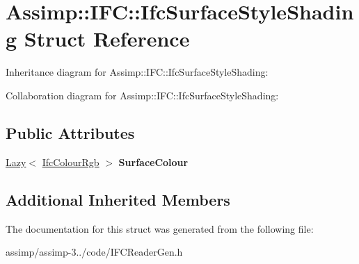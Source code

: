 \hypertarget{struct_assimp_1_1_i_f_c_1_1_ifc_surface_style_shading}{\section{Assimp\+:\+:I\+F\+C\+:\+:Ifc\+Surface\+Style\+Shading Struct Reference}
\label{struct_assimp_1_1_i_f_c_1_1_ifc_surface_style_shading}
}


Inheritance diagram for Assimp\+:\+:I\+F\+C\+:\+:Ifc\+Surface\+Style\+Shading\+:


Collaboration diagram for Assimp\+:\+:I\+F\+C\+:\+:Ifc\+Surface\+Style\+Shading\+:
\subsection*{Public Attributes}
\begin{DoxyCompactItemize}
\item 
\hypertarget{struct_assimp_1_1_i_f_c_1_1_ifc_surface_style_shading_ac8af1dc9d03beba92d7b45ffe92d6fc5}{\hyperlink{struct_assimp_1_1_s_t_e_p_1_1_lazy}{Lazy}$<$ \hyperlink{struct_assimp_1_1_i_f_c_1_1_ifc_colour_rgb}{Ifc\+Colour\+Rgb} $>$ {\bfseries Surface\+Colour}}\label{struct_assimp_1_1_i_f_c_1_1_ifc_surface_style_shading_ac8af1dc9d03beba92d7b45ffe92d6fc5}

\end{DoxyCompactItemize}
\subsection*{Additional Inherited Members}


The documentation for this struct was generated from the following file\+:\begin{DoxyCompactItemize}
\item 
assimp/assimp-\/3../code/I\+F\+C\+Reader\+Gen.\+h\end{DoxyCompactItemize}
